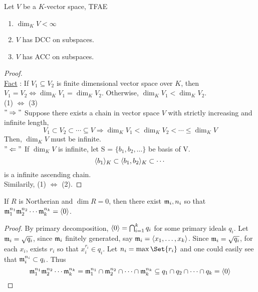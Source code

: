 \begin{lemma} \label{vector-space-dim-acc-dcc-relation}
  Let $V$ be a $K$-vector space, TFAE
  \begin{enumerate}[(1)]
    \item $\dim_K V < \infty$
    \item $V$ has DCC on subspaces.
    \item $V$ has ACC on subspaces.
  \end{enumerate}

  \begin{proof} $ $ \\
    \underline{Fact} : If $V_1 \subseteq V_2$ is finite dimensional vector space
    over $K$, then $V_1 = V_2 \iff \dim_K V_1 = \dim_K V_2$. Otherwise, $\dim_K V_1 < \dim_K V_2$. \\
    (1) $\Leftrightarrow$ (3) \\
    $"\Rightarrow"$ Suppose there exists a chain in vector space $V$ with strictly
    increasing and infinite length,
    \[
      V_1 \subset V_2 \subset \cdots \subseteq V \Rightarrow \dim_K V_1 < \dim_K V_2 < \cdots 
      \leq \dim_K V
    \]
    Then, $\dim_K V$ must be infinite. \\
    $"\Leftarrow"$ If $\dim_K V$ is infinite, let S = $\{b_1, b_2, \dots \}$ be basis of V.
    \[
      \langle b_1\rangle_K \subset \langle b_1 , b_2\rangle_K \subset \cdots
    \]
    is a infinite ascending chain.\\
    Similarily, (1) $\Leftrightarrow$ (2).
  \end{proof}
\end{lemma}

\begin{lemma}
If $R$ is Northerian and $\dim R = 0$, then there exist $\mathfrak{m}_i, n_i$ so that
$\mathfrak{m}_1^{n_1} \mathfrak{m}_2^{n_2} \dotsm \mathfrak{m}_k^{n_k} = \langle0\rangle$.

\begin{proof}
  By primary decomposition, $\langle0\rangle = \bigcap_{i=1}^k q_i$ for
  some primary ideals $q_i$. Let $\mathfrak{m}_i = \sqrt{q_i}$, since
  $\mathfrak{m}_i$ finitely generated, say $\mathfrak{m}_i = \langle x_1, \dots, x_k\rangle$.
  Since $\mathfrak{m}_i = \sqrt{q_i}$, for each $x_i$, exists $r_i$
  so that $x_i^{r_i} \in q_i$. Let $n_i = \max \Set{r_i}$
  and one could easily see that $\mathfrak{m}_i^{n_i} \subset q_i$.
  Thus
  \[
    \mathfrak{m}_1^{n_1}\mathfrak{m}_2^{n_2} \dotsm \mathfrak{m}_k^{n_k} = 
    \mathfrak{m}_1^{n_1} \cap \mathfrak{m}_2^{n_2} \cap \dotsm \cap \mathfrak{m}_k^{n_k} \subseteq
    q_1 \cap q_2 \cap \dotsm \cap q_k = \langle0\rangle
  \]
\end{proof}
\end{lemma}

